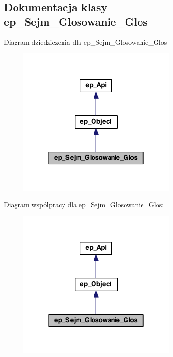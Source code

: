 \hypertarget{classep___sejm___glosowanie___glos}{\subsection{Dokumentacja klasy ep\-\_\-\-Sejm\-\_\-\-Glosowanie\-\_\-\-Glos}
\label{classep___sejm___glosowanie___glos}
}


Diagram dziedziczenia dla ep\-\_\-\-Sejm\-\_\-\-Glosowanie\-\_\-\-Glos\nopagebreak
\begin{figure}[H]
\begin{center}
\leavevmode
\includegraphics[width=226pt]{classep___sejm___glosowanie___glos__inherit__graph}
\end{center}
\end{figure}


Diagram współpracy dla ep\-\_\-\-Sejm\-\_\-\-Glosowanie\-\_\-\-Glos\-:\nopagebreak
\begin{figure}[H]
\begin{center}
\leavevmode
\includegraphics[width=226pt]{classep___sejm___glosowanie___glos__coll__graph}
\end{center}
\end{figure}
